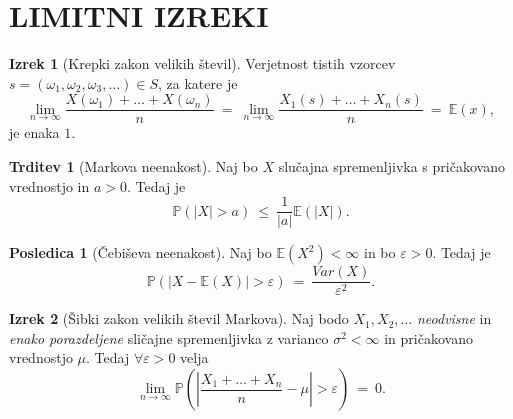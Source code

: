 \documentclass[11pt]{article}
\newcommand{\p}{\mathbb{P}}
\newcommand{\E}{\mathbb{E}}
\newcommand{\1}{\mathbbm{1}}
\theoremstyle{definition}
\theoremstyle{definition}
\newtheorem{trditev}{Trditev}[section]
\theoremstyle{definition}
\newtheorem{izrek}{Izrek}[section]
\newtheorem*{posledica}{Posledica}
\begin{document}
\pagebreak


\section{LIMITNI IZREKI}
\vspace{0.5cm}

\begin{izrek}[Krepki zakon velikih števil]

Verjetnost tistih vzorcev \\$s = (\omega_1, \omega_2, \omega_3, \ldots) \in S$, za katere je
$$\lim_{n \rightarrow \infty} \frac{X(\omega_1) + \ldots + X(\omega_n)}{n} ~=~ \lim_{n \rightarrow \infty} \frac{X_1(s) + \ldots + X_n(s)}{n} ~=~ \E(x),$$
je enaka $1$.

\end{izrek}
\vspace{0.5cm}

\begin{trditev}[Markova neenakost]

Naj bo $X$ slučajna spremenljivka s pričakovano vrednostjo in $a>0$. Tedaj je
$$\p(|X| > a) ~\leq~ \frac{1}{|a|} \E(|X|).$$

\end{trditev}
\vspace{0.5cm}

\begin{posledica}[Čebiševa neenakost]

Naj bo $\E(X^2) < \infty$ in bo $\varepsilon > 0$. Tedaj je
$$\p(|X - \E(X)| > \varepsilon) ~=~ \frac{Var(X)}{\varepsilon^2}.$$

\end{posledica}
\vspace{0.5cm}

\begin{izrek}[Šibki zakon velikih števil Markova]

Naj bodo $X_1, X_2, \ldots$ \textit{neodvisne} in \textit{enako porazdeljene} sličajne spremenljivka z varianco $\sigma^2 < \infty$ in pričakovano vrednostjo $\mu$. Tedaj $\forall \varepsilon > 0$ velja
$$\lim_{n \rightarrow \infty} \p \left( \left| \frac{X_1 + \ldots + X_n}{n} - \mu \right| > \varepsilon \right) ~=~ 0.$$

\end{izrek}
\vspace{0.5cm}
\end{document}
